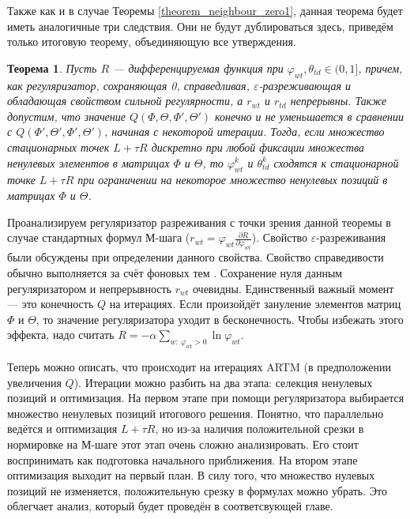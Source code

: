 \documentclass[12pt]{article}
\newtheorem{theorem}{Теорема}
\renewcommand{\phi}{\varphi}
\begin{document}
Также как и в случае Теоремы \ref{theorem_neighbour_zero1}, данная теорема будет иметь аналогичные три следствия. Они не будут дублироваться здесь, приведём только итоговую теорему, объединяющую все утверждения.
\begin{theorem} \label{theorem_convergence1} Пусть $R$ --- дифференцируемая функция при $\phi_{wt}, \theta_{td} \in (0, 1]$, причем, как регуляризатор, сохраняющая 0, справедливая, $\varepsilon$-разреживающая и обладающая свойством сильной регулярности, а  $r_{wt}$ и $r_{td}$ непрерывны. Также допустим,  что значение $Q(\Phi, \Theta, \Phi', \Theta')$ конечно и не уменьшается в сравнении с $Q(\Phi', \Theta', \Phi', \Theta')$, начиная с некоторой итерации. Тогда, если множество стационарных точек $L + \tau R$ дискретно при любой фиксации множества ненулевых элементов в матрицах $\Phi$ и $\Theta$, то $\phi_{wt}^{k}$ и $\theta_{td}^{k}$ сходятся к стационарной точке $L + \tau R$ при ограничении на некоторое множество ненулевых позиций в матрицах $\Phi$ и $\Theta$.
\end{theorem}

Проанализируем регуляризатор разреживания с точки зрения данной теоремы в случае стандартных формул М-шага ($r_{wt} = \phi_{wt}\frac{\partial{R}}{\partial{\phi_{wt}}}$). Свойство $\varepsilon$-разреживания были обсуждены при определении данного свойства. Свойство справедивости обычно выполняется за счёт фоновых тем \cite{artmdef2} . Сохранение нуля данным регуляризатором и непрерывность $r_{wt}$ очевидны. Единственный важный момент --- это конечность $Q$ на итерациях. Если произойдёт зануление элементов матриц $\Phi$ и $\Theta$, то значение регуляризатора уходит в бесконечность. Чтобы избежать этого эффекта, надо считать $R = -\alpha \sum\limits_{w\colon~\phi_{wt} > 0} \ln\phi_{wt}$.

Теперь можно описать, что происходит на итерациях ARTM (в предположении увеличения $Q$). Итерации можно разбить на два этапа: селекция ненулевых позиций и оптимизация. На первом этапе при помощи регуляризатора выбирается множество ненулевых позиций итогового решения. Понятно, что параллельно ведётся и оптимизация $L + \tau R$, но из-за наличия положительной срезки в нормировке на М-шаге этот этап очень сложно анализировать. Его стоит воспринимать как подготовка начального приближения. На втором этапе оптимизация выходит на первый план. В силу того, что множество нулевых позиций не изменяется, положительную срезку в формулах можно убрать. Это облегчает анализ, который будет проведён в соответсвующей главе.
\end{document}
